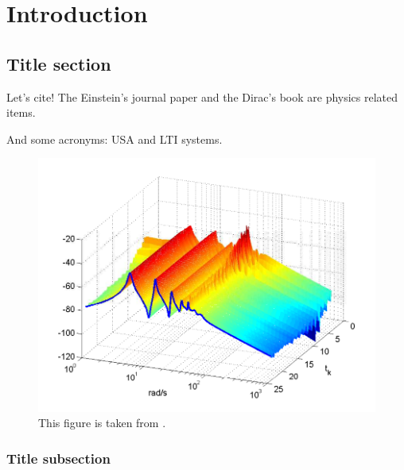\chapter{Introduction}
\label{ch1}

\begin{spacing}{1} 
\end{spacing}
\doublespacing 


\section{Title section}

Let's cite! The Einstein's journal paper \cite{einstein} and the Dirac's 
book \cite{dirac} are physics related items. 

And some acronyms: \ac{USA} and \ac{LTI} systems.

\begin{figure}
\centering
\includegraphics[width=0.8\columnwidth]{imgs/buildmagnitude.pdf}
\caption[Short description for list of figures]{This figure is taken from \cite{Sca:16}.}
\label{fig-magnitude}
\end{figure}%

\subsection{Title subsection}

\kant[1-6]

